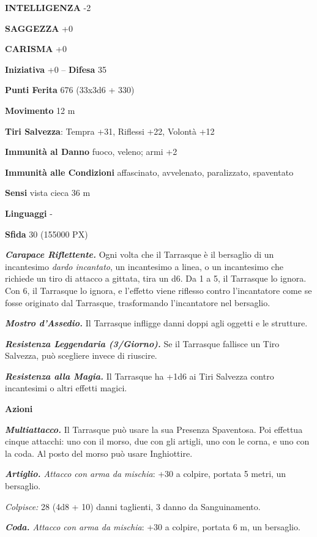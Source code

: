 \begin{multicols}{2}
\textbf{INTELLIGENZA} -2

\textbf{SAGGEZZA} +0

\textbf{CARISMA} +0

\textbf{Iniziativa} +0 -- \textbf{Difesa} 35

\textbf{Punti Ferita} 676 (33x3d6 + 330)

\textbf{Movimento} 12 m

\textbf{Tiri Salvezza}: Tempra +31, Riflessi +22, Volontà +12

\textbf{Immunità al Danno} fuoco, veleno; armi +2

\textbf{Immunità alle Condizioni} affascinato, avvelenato, paralizzato, spaventato

\textbf{Sensi} vista cieca 36 m

\textbf{Linguaggi} -

\textbf{Sfida} 30 (155000 PX)

\textit{\textbf{Carapace Riflettente.}} Ogni volta che il Tarrasque è il bersaglio di un incantesimo \textit{dardo incantato}, un incantesimo a linea, o un incantesimo che richiede un tiro di attacco a gittata, tira un d6. Da 1 a 5, il Tarrasque lo ignora. Con 6, il Tarrasque lo ignora, e l'effetto viene riflesso contro l'incantatore come se fosse originato dal Tarrasque, trasformando l'incantatore nel bersaglio.

\textit{\textbf{Mostro d'Assedio.}} Il Tarrasque infligge danni doppi agli oggetti e le strutture.

\textit{\textbf{Resistenza Leggendaria (3/Giorno).}} Se il Tarrasque fallisce un Tiro Salvezza, può scegliere invece di riuscire.

\textit{\textbf{Resistenza alla Magia.}} Il Tarrasque ha +1d6 ai Tiri Salvezza contro incantesimi o altri effetti magici.

\textbf{Azioni}

\textit{\textbf{Multiattacco.}} Il Tarrasque può usare la sua Presenza Spaventosa. Poi effettua cinque attacchi: uno con il morso, due con gli artigli, uno con le corna, e uno con la coda. Al posto del morso può usare Inghiottire.

\textit{\textbf{Artiglio.} Attacco con arma da mischia}: +30 a colpire, portata 5 metri, un bersaglio.

\textit{Colpisce:} 28 (4d8 + 10) danni taglienti, 3 danno da Sanguinamento.

\textit{\textbf{Coda.} Attacco con arma da mischia}: +30 a colpire, portata 6 m, un bersaglio.


\end{multicols}
